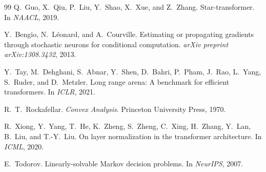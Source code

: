 \documentclass[11pt,twocolumn]{article}
\begin{document}
\begin{thebibliography}{99}
Q.~Guo, X.~Qiu, P.~Liu, Y.~Shao, X.~Xue, and Z.~Zhang.
\newblock Star-transformer.
\newblock In \emph{NAACL}, 2019.

Y.~Bengio, N.~L\'{e}onard, and A.~Courville.
\newblock Estimating or propagating gradients through stochastic neurons for
  conditional computation.
\newblock \emph{arXiv preprint arXiv:1308.3432}, 2013.

Y.~Tay, M.~Dehghani, S.~Abnar, Y.~Shen, D.~Bahri, P.~Pham, J.~Rao,
L.~Yang, S.~Ruder, and D.~Metzler.
\newblock Long range arena: A benchmark for efficient transformers.
\newblock In \emph{ICLR}, 2021.

R.~T.~Rockafellar.
\newblock \emph{Convex Analysis}.
\newblock Princeton University Press, 1970.

R.~Xiong, Y.~Yang, T.~He, K.~Zheng, S.~Zheng, C.~Xing, H.~Zhang,
Y.~Lan, B.~Liu, and T.-Y.~Liu.
\newblock On layer normalization in the transformer architecture.
\newblock In \emph{ICML}, 2020.

E.~Todorov.
\newblock Linearly-solvable {Markov} decision problems.
\newblock In \emph{NeurIPS}, 2007.

\end{thebibliography}
\end{document}
